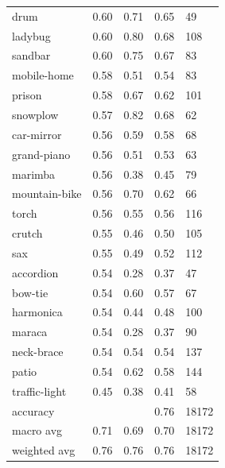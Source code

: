 \begin{center}
\begin{longtable}{lllll}
drum & 0.60 & 0.71 & 0.65 & 49 \\
ladybug & 0.60 & 0.80 & 0.68 & 108 \\
sandbar & 0.60 & 0.75 & 0.67 & 83 \\
mobile-home & 0.58 & 0.51 & 0.54 & 83 \\
prison & 0.58 & 0.67 & 0.62 & 101 \\
snowplow & 0.57 & 0.82 & 0.68 & 62 \\
car-mirror & 0.56 & 0.59 & 0.58 & 68 \\
grand-piano & 0.56 & 0.51 & 0.53 & 63 \\
marimba & 0.56 & 0.38 & 0.45 & 79 \\
mountain-bike & 0.56 & 0.70 & 0.62 & 66 \\
torch & 0.56 & 0.55 & 0.56 & 116 \\
crutch & 0.55 & 0.46 & 0.50 & 105 \\
sax & 0.55 & 0.49 & 0.52 & 112 \\
accordion & 0.54 & 0.28 & 0.37 & 47 \\
bow-tie & 0.54 & 0.60 & 0.57 & 67 \\
harmonica & 0.54 & 0.44 & 0.48 & 100 \\
maraca & 0.54 & 0.28 & 0.37 & 90 \\
neck-brace & 0.54 & 0.54 & 0.54 & 137 \\
patio & 0.54 & 0.62 & 0.58 & 144 \\
traffic-light & 0.45 & 0.38 & 0.41 & 58 \\
\midrule
accuracy &  &  & 0.76 & 18172 \\
macro avg & 0.71 & 0.69 & 0.70 & 18172 \\
weighted avg & 0.76 & 0.76 & 0.76 & 18172 \\
\bottomrule
\end{longtable}
\end{center}
